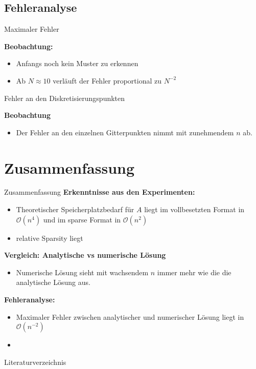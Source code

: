 \documentclass[9pt, t]{beamer}
\begin{document}
\subsection{Fehleranalyse}
\begin{frame}{Maximaler Fehler}


    \textbf{Beobachtung:}
    \begin{itemize}
        \item Anfangs noch kein Muster zu erkennen
        \item Ab \(N \approx 10\) verläuft der Fehler proportional zu
              \(N^{-2}\)
    \end{itemize}
\end{frame}

\begin{frame}{Fehler an den Diskretisierungspunkten}


    \textbf{Beobachtung}
    \begin{itemize}
        \item Der Fehler an den einzelnen Gitterpunkten nimmt mit zunehmendem
              \(n\) ab.
    \end{itemize}

\end{frame}

\section{Zusammenfassung}

\begin{frame}{Zusammenfassung}
    \textbf{Erkenntnisse aus den Experimenten:}
    \begin{itemize}
        \item Theoretischer Speicherplatzbedarf für \(A\) liegt im
              vollbesetzten Format in \(\mathcal{O}(n^4)\) und im sparse Format
              in \(\mathcal{O}(n^2)\)
        \item relative Sparsity liegt
    \end{itemize}

    \textbf{Vergleich: Analytische vs numerische Lösung}
    \begin{itemize}
        \item Numerische Lösung sieht mit wachsendem \(n\) immer mehr wie die
              die analytische Lösung aus.
    \end{itemize}

    \textbf{Fehleranalyse:}
    \begin{itemize}
        \item Maximaler Fehler zwischen analytischer und numerischer Lösung
              liegt in \(\mathcal{O}(n^{-2})\) \item
    \end{itemize}
\end{frame}

\begin{frame}{Literaturverzeichnis}
    \printbibliography
\end{frame}
\end{document}
